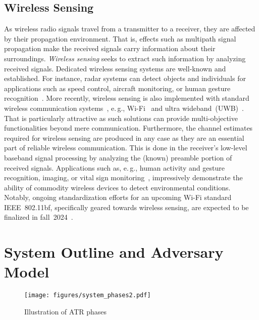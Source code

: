 \documentclass[conference]{IEEEtran}
\makeatletter
\newcommand{\eg}{e.\@\,g.\@\xspace}
\makeatother
\begin{document}
\subsection{Wireless Sensing}
As wireless radio signals travel from a transmitter to a receiver, they are affected by their propagation environment. That is, effects such as multipath signal propagation make the received signals carry information about their surroundings. \textit{Wireless sensing} seeks to extract such information by analyzing received signals. Dedicated wireless sensing systems are well-known and established. For instance, radar systems can detect objects and individuals for applications such as speed control, aircraft monitoring, or human gesture recognition~\cite{lienSoliUbiquitousGesture2016}. More recently, wireless sensing is also implemented with standard wireless communication systems~\cite{paulSurveyRFCommunications2017}, \eg, \mbox{Wi-Fi}~\cite{maWiFiSensingChannel2019} and ultra wideband~(UWB)~\cite{qionghuangUWBThroughWallImaging2010}. That is particularly attractive as such solutions can provide multi-objective functionalities beyond mere communication. Furthermore, the channel estimates required for wireless sensing are produced in any case as they are an essential part of reliable wireless communication. This is done in the receiver's low-level baseband signal processing by analyzing the (known) preamble portion of received signals. Applications such as, \eg, human activity and gesture recognition, imaging, or vital sign monitoring~\cite{yousefiSurveyBehaviorRecognition2017, maWiFiSensingChannel2019}, impressively demonstrate the ability of commodity wireless devices to detect environmental conditions. Notably, ongoing standardization efforts for an upcoming \mbox{Wi-Fi} standard IEEE~802.11bf, specifically geared towards wireless sensing, are expected to be finalized in fall~2024~\cite{ieee_80211bf}.






\section{System Outline and Adversary Model}

\begin{figure}
\centering
\texttt{[image: figures/system\_phases2.pdf]}
\caption{Illustration of ATR phases}
\label{fig:system_phases}
\end{figure}
\end{document}
